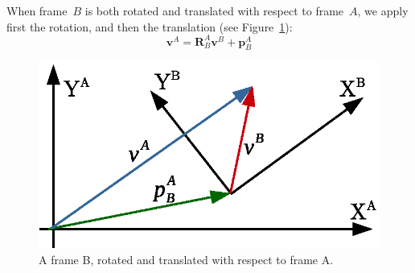When frame~$B$ is both rotated and translated with respect to frame~$A$, we apply first the rotation, and then the translation (see Figure~\ref{fig:rotation_translation}):
\begin{equation}
 \mathbf{v}^A = \mathbf{R}^A_B\mathbf{v}^B + \mathbf{p}^A_B
\end{equation}
\begin{figure}[bth!]
  \begin{center}
    \includegraphics[width=1.0\columnwidth]{figures/rotation_translation.eps}
    \caption{A frame B, rotated and translated with respect to frame A.}
    \label{fig:rotation_translation}
  \end{center}
\end{figure}



